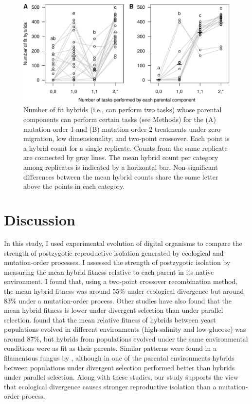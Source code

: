 \begin{doublespace}
\begin{figure}
\centering
\includegraphics[width=0.95\linewidth]{fit_hybrid_components.pdf}
\caption{Number of fit hybrids (i.e., can perform two tasks)
  whose parental components can perform certain tasks (see Methods)
  for the (A) mutation-order 1 and (B) mutation-order 2 treatments
  under zero migration, low dimensionality, and two-point crossover.
  Each point is a hybrid count for a single replicate.
  Counts from the same replicate are connected by gray lines.
  The mean hybrid count per category among replicates
  is indicated by a horizontal bar.
  Non-significant differences between the mean hybrid counts
  share the same letter above the points in each category.}
\label{fit_hybrid_components}
\end{figure}



\section{Discussion}

In this study, I used experimental evolution of digital organisms
to compare the strength of postzygotic reproductive isolation
generated by ecological and mutation-order processes.
%
I assessed the strength of postzygotic isolation
by measuring the mean hybrid fitness relative to each parent
in its native environment.
%
I found that, using a two-point crossover recombination method,
the mean hybrid fitness was around 55\% under ecological divergence
but around 83\% under a mutation-order process.
%
Other studies have also found that the mean hybrid fitness
is lower under divergent selection than under parallel selection.
%
\citet{det07} found that the mean relative fitness of hybrids
between yeast populations evolved in different environments
(high-salinity and low-glucose) was around 87\%,
but hybrids from populations evolved
under the same environmental conditions were as fit as their parents.
%
Similar patterns were found in a filamentous fungus by \citet{det08},
although in one of the parental environments
hybrids between populations under divergent selection
performed better than hybrids under parallel selection.
%
Along with these studies, our study supports
the view that ecological divergence causes
stronger reproductive isolation than a mutation-order process.




\end{doublespace}
